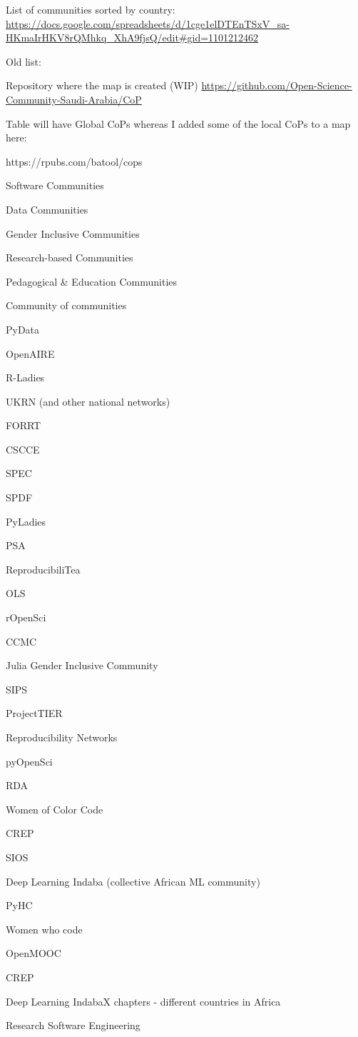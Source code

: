 \documentclass[
  letterpaper,
  DIV=11,
  numbers=noendperiod]{scrreport}
\begin{document}
List of communities sorted by country:
\url{https://docs.google.com/spreadsheets/d/1cge1elDTEnTSxV_sa-HKmaIrHKV8rQMhkq_XhA9fjsQ/edit\#gid=1101212462}

Old list:

Repository where the map is created (WIP)
\url{https://github.com/Open-Science-Community-Saudi-Arabia/CoP}

Table will have Global CoPs whereas I added some of the local CoPs to a
map here:

https://rpubs.com/batool/cops

Software Communities

Data Communities

Gender Inclusive Communities

Research-based Communities

Pedagogical \& Education Communities

Community of communities

PyData

OpenAIRE

R-Ladies

UKRN (and other national networks)

FORRT

CSCCE

SPEC

SPDF

PyLadies

PSA

ReproducibiliTea

OLS

rOpenSci

CCMC

Julia Gender Inclusive Community

SIPS

ProjectTIER

Reproducibility Networks

pyOpenSci

RDA

Women of Color Code

CREP

SIOS

Deep Learning Indaba (collective African ML community)

PyHC

Women who code

OpenMOOC

CREP

Deep Learning IndabaX chapters - different countries in Africa

Research Software Engineering
\end{document}

